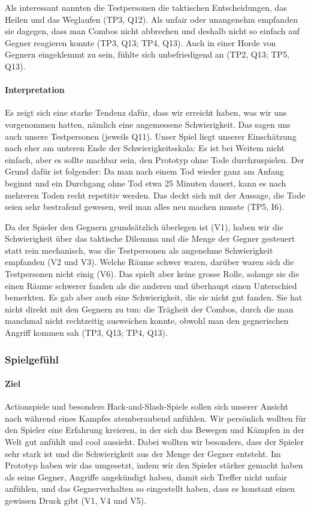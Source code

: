 \documentclass[../Main.tex]{subfiles}
\begin{document}
Als interessant nannten die Testpersonen die taktischen Entscheidungen, das Heilen und das Weglaufen (TP3, Q12). Als unfair oder unangenehm empfanden sie dagegen, dass man Combos nicht abbrechen und deshalb nicht so einfach auf Gegner reagieren konnte (TP3, Q13; TP4, Q13). Auch in einer Horde von Gegnern eingeklemmt zu sein, fühlte sich unbefriedigend an (TP2, Q13; TP5, Q13).

\paragraph{Interpretation}
Es zeigt sich eine starke Tendenz dafür, dass wir erreicht haben, was wir uns vorgenommen hatten, nämlich eine angemessene Schwierigkeit. Das sagen uns auch unsere Testpersonen (jeweils Q11). Unser Spiel liegt unserer Einschätzung nach eher am unteren Ende der Schwierigkeitsskala: Es ist bei Weitem nicht einfach, aber es sollte machbar sein, den Prototyp ohne Tode durchzuspielen. Der Grund dafür ist folgender: Da man nach einem Tod wieder ganz am Anfang beginnt und ein Durchgang ohne Tod etwa 25 Minuten dauert, kann es nach mehreren Toden recht repetitiv werden. Das deckt sich mit der Aussage, die Tode seien sehr bestrafend gewesen, weil man alles neu machen musste (TP5, I6).

Da der Spieler den Gegnern grundsätzlich überlegen ist (V1), haben wir die Schwierigkeit über das taktische Dilemma und die Menge der Gegner gesteuert statt rein mechanisch, was die Testpersonen als angenehme Schwierigkeit empfanden (V2 und V3). Welche Räume schwer waren, darüber waren sich die Testpersonen nicht einig (V6). Das spielt aber keine grosse Rolle, solange sie die einen Räume schwerer fanden als die anderen und überhaupt einen Unterschied bemerkten. Es gab aber auch eine Schwierigkeit, die sie nicht gut fanden. Sie hat nicht direkt mit den Gegnern zu tun: die Trägheit der Combos, durch die man manchmal nicht rechtzeitig ausweichen konnte, obwohl man den gegnerischen Angriff kommen sah (TP3, Q13; TP4, Q13).

\subsubsection{Spielgefühl}

\paragraph{Ziel}
Actionspiele und besonders Hack-and-Slash-Spiele sollen sich unserer Ansicht nach während eines Kampfes atemberaubend anfühlen. Wir persönlich wollten für den Spieler eine Erfahrung kreieren, in der sich das Bewegen und Kämpfen in der Welt gut anfühlt und cool aussieht. Dabei wollten wir besonders, dass der Spieler sehr stark ist und die Schwierigkeit aus der Menge der Gegner entsteht. Im Prototyp haben wir das umgesetzt, indem wir den Spieler stärker gemacht haben als seine Gegner, Angriffe angekündigt haben, damit sich Treffer nicht unfair anfühlen, und das Gegnerverhalten so eingestellt haben, dass es konstant einen gewissen Druck gibt (V1, V4 und V5).
\end{document}
